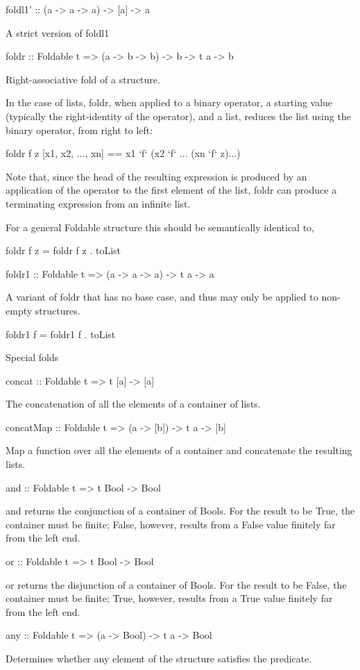 foldl1' :: (a -> a -> a) -> [a] -> a

A strict version of foldl1

foldr :: Foldable t => (a -> b -> b) -> b -> t a -> b

Right-associative fold of a structure.

In the case of lists, foldr, when applied to a binary operator, a starting value (typically the right-identity of the operator), and a list, reduces the list using the binary operator, from right to left:

foldr f z [x1, x2, ..., xn] == x1 `f` (x2 `f` ... (xn `f` z)...)

Note that, since the head of the resulting expression is produced by an application of the operator to the first element of the list, foldr can produce a terminating expression from an infinite list.

For a general Foldable structure this should be semantically identical to,

foldr f z = foldr f z . toList

foldr1 :: Foldable t => (a -> a -> a) -> t a -> a

A variant of foldr that has no base case, and thus may only be applied to non-empty structures.

foldr1 f = foldr1 f . toList

Special folds

concat :: Foldable t => t [a] -> [a]

The concatenation of all the elements of a container of lists.

concatMap :: Foldable t => (a -> [b]) -> t a -> [b]

Map a function over all the elements of a container and concatenate the resulting lists.

and :: Foldable t => t Bool -> Bool

and returns the conjunction of a container of Bools. For the result to be True, the container must be finite; False, however, results from a False value finitely far from the left end.

or :: Foldable t => t Bool -> Bool

or returns the disjunction of a container of Bools. For the result to be False, the container must be finite; True, however, results from a True value finitely far from the left end.

any :: Foldable t => (a -> Bool) -> t a -> Bool

Determines whether any element of the structure satisfies the predicate.

